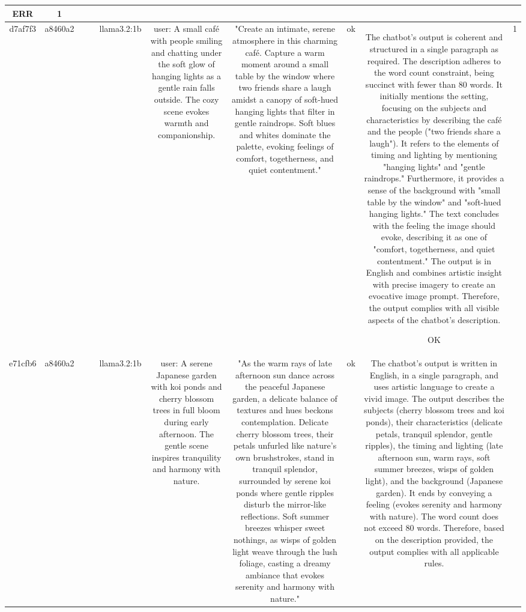 \begin{table}[h!]
\begin{tabular}{|c|c|c|c|c|c|c|c|c|c|}
ERR & 1\\
\hline
d7af7f3 & a8460a2 &  &  & llama3.2:1b & user: A small café with people smiling and chatting under the soft glow of hanging lights as a gentle rain falls outside. The cozy scene evokes warmth and companionship. & "Create an intimate, serene atmosphere in this charming café. Capture a warm moment around a small table by the window where two friends share a laugh amidst a canopy of soft-hued hanging lights that filter in gentle raindrops. Soft blues and whites dominate the palette, evoking feelings of comfort, togetherness, and quiet contentment." & ok & The chatbot's output is coherent and structured in a single paragraph as required. The description adheres to the word count constraint, being succinct with fewer than 80 words. It initially mentions the setting, focusing on the subjects and characteristics by describing the café and the people ("two friends share a laugh"). It refers to the elements of timing and lighting by mentioning "hanging lights" and "gentle raindrops." Furthermore, it provides a sense of the background with "small table by the window" and "soft-hued hanging lights." The text concludes with the feeling the image should evoke, describing it as one of "comfort, togetherness, and quiet contentment." The output is in English and combines artistic insight with precise imagery to create an evocative image prompt. Therefore, the output complies with all visible aspects of the chatbot's description.

OK & 1\\
\hline
e71cfb6 & a8460a2 &  &  & llama3.2:1b & user: A serene Japanese garden with koi ponds and cherry blossom trees in full bloom during early afternoon. The gentle scene inspires tranquility and harmony with nature. & "As the warm rays of late afternoon sun dance across the peaceful Japanese garden, a delicate balance of textures and hues beckons contemplation. Delicate cherry blossom trees, their petals unfurled like nature's own brushstrokes, stand in tranquil splendor, surrounded by serene koi ponds where gentle ripples disturb the mirror-like reflections. Soft summer breezes whisper sweet nothings, as wisps of golden light weave through the lush foliage, casting a dreamy ambiance that evokes serenity and harmony with nature." & ok & The chatbot's output is written in English, in a single paragraph, and uses artistic language to create a vivid image. The output describes the subjects (cherry blossom trees and koi ponds), their characteristics (delicate petals, tranquil splendor, gentle ripples), the timing and lighting (late afternoon sun, warm rays, soft summer breezes, wisps of golden light), and the background (Japanese garden). It ends by conveying a feeling (evokes serenity and harmony with nature). The word count does not exceed 80 words. Therefore, based on the description provided, the output complies with all applicable rules.


\end{tabular}
\end{table}
